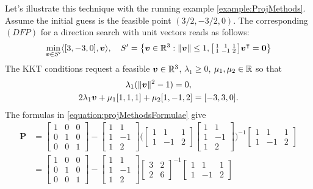 \begin{example}
Let's illustrate this technique with the running example \ref{example:ProjMethods}.  Assume the initial guess is the feasible point $(3/2, -3/2, 0)$.  The corresponding $(DFP)$ for a direction search with unit vectors reads as follows:
\begin{equation*}
\min_{\boldsymbol{v} \in S'} \langle [3,-3,0], \boldsymbol{v} \rangle, \quad S' = \big\{ \boldsymbol{v} \in \mathbb{R}^3 : \lVert \boldsymbol{v} \rVert\leq 1, \big[ \begin{smallmatrix} 1 & 1 & 1 \\ 1 & -1 & 2 \end{smallmatrix}\big] {\boldsymbol{v}}^\intercal = \boldsymbol{0} \big\}
\end{equation*}
The KKT conditions request a feasible $\boldsymbol{v} \in \mathbb{R}^3$, $\lambda_1 \geq 0$, $\mu_1, \mu_2 \in \mathbb{R}$ so that
\begin{gather*}
\lambda_1(\lVert \boldsymbol{v} \rVert^2 - 1) = 0, \\
2\lambda_1 \boldsymbol{v} + \mu_1 [1,1,1] + \mu_2 [1,-1,2] = [-3,3,0].
\end{gather*}
The formulas in \eqref{equation:projMethodsFormulae} give
\begin{align*}
\boldsymbol{P} &= \begin{bmatrix} 1 & 0 & 0 \\ 0 & 1 & 0 \\ 0 & 0 & 1 \end{bmatrix} - \begin{bmatrix} 1 & 1 \\ 1 & -1 \\ 1 & 2 \end{bmatrix} \bigg( \begin{bmatrix} 1 & 1 & 1 \\ 1 & -1 & 2 \end{bmatrix} \begin{bmatrix} 1 & 1 \\ 1 & -1 \\ 1 & 2 \end{bmatrix} \bigg)^{-1} \begin{bmatrix} 1 & 1 & 1 \\ 1 & -1 & 2 \end{bmatrix} \\ 
&= \begin{bmatrix} 1 & 0 & 0 \\ 0 & 1 & 0 \\ 0 & 0 & 1 \end{bmatrix} - \begin{bmatrix} 1 & 1 \\ 1 & -1 \\ 1 & 2 \end{bmatrix} \begin{bmatrix} 3 & 2 \\ 2 & 6 \end{bmatrix}^{-1} \begin{bmatrix} 1 & 1 & 1 \\ 1 & -1 & 2 \end{bmatrix} \\

\end{align*}
\end{example}
